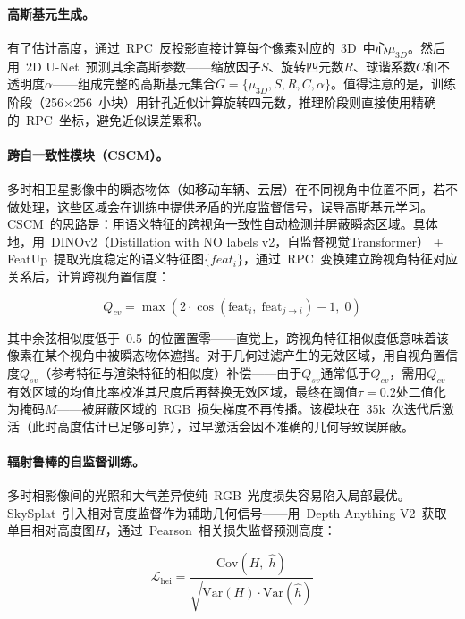 \paragraph{高斯基元生成。}有了估计高度，通过~RPC~反投影直接计算每个像素对应的~3D~中心$\mu_{3D}$。然后用~2D U-Net~预测其余高斯参数——缩放因子$S$、旋转四元数$R$、球谐系数$C$和不透明度$\alpha$——组成完整的高斯基元集合$G = \{\mu_{3D}, S, R, C, \alpha\}$。值得注意的是，训练阶段（256$\times$256~小块）用针孔近似计算旋转四元数，推理阶段则直接使用精确的~RPC~坐标，避免近似误差累积。

\paragraph{跨自一致性模块（CSCM）。}多时相卫星影像中的瞬态物体（如移动车辆、云层）在不同视角中位置不同，若不做处理，这些区域会在训练中提供矛盾的光度监督信号，误导高斯基元学习。CSCM~的思路是：用语义特征的跨视角一致性自动检测并屏蔽瞬态区域。具体地，用~DINOv2（Distillation with NO labels v2，自监督视觉Transformer） + FeatUp~提取光度稳定的语义特征图$\{feat_i\}$，通过~RPC~变换建立跨视角特征对应关系后，计算跨视角置信度：

\begin{equation}
Q_{cv} = \max\!\left(2 \cdot \cos(\text{feat}_i,\;\text{feat}_{j \rightarrow i}) - 1,\; 0\right)
\end{equation}

其中余弦相似度低于~0.5~的位置置零——直觉上，跨视角特征相似度低意味着该像素在某个视角中被瞬态物体遮挡。对于几何过滤产生的无效区域，用自视角置信度$Q_{sv}$（参考特征与渲染特征的相似度）补偿——由于$Q_{sv}$通常低于$Q_{cv}$，需用$Q_{cv}$有效区域的均值比率校准其尺度后再替换无效区域，最终在阈值$\tau=0.2$处二值化为掩码$M$——被屏蔽区域的~RGB~损失梯度不再传播。该模块在~35k~次迭代后激活（此时高度估计已足够可靠），过早激活会因不准确的几何导致误屏蔽。

\paragraph{辐射鲁棒的自监督训练。}多时相影像间的光照和大气差异使纯~RGB~光度损失容易陷入局部最优。SkySplat~引入相对高度监督作为辅助几何信号——用~Depth Anything V2~获取单目相对高度图$H$，通过~Pearson~相关损失监督预测高度：

\begin{equation}
\mathcal{L}_{\text{hei}} = \frac{\text{Cov}(H,\;\hat{h})}{\sqrt{\text{Var}(H) \cdot \text{Var}(\hat{h})}}
\end{equation}

